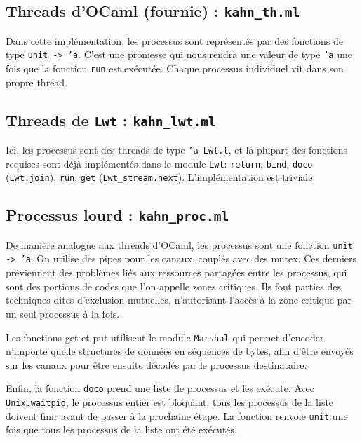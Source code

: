 \subsection{Threads d'OCaml (fournie) :
\texttt{kahn\_th.ml}}\label{threads-docaml-fournie-kahnux5fth.ml}

Dans cette implémentation, les processus sont représentés par des
fonctions de type \texttt{unit -\textgreater{} 'a}. C'est une promesse
qui nous rendra une valeur de type \texttt{'a} une fois que la fonction
\texttt{run} est exécutée. Chaque processus individuel vit dans son
propre thread.

\subsection{Threads de \texttt{Lwt} :
\texttt{kahn\_lwt.ml}}\label{threads-de-lwt-kahnux5flwt.ml}

Ici, les processus sont des threads de type \texttt{'a Lwt.t}, et la
plupart des fonctions requises sont déjà implémentés dans le module 
\texttt{Lwt}: \texttt{return}, \texttt{bind}, \texttt{doco} 
(\texttt{Lwt.join}), \texttt{run}, \texttt{get}
(\texttt{Lwt\_stream.next}). L'implémentation est triviale.

\subsection{Processus lourd :
\texttt{kahn\_proc.ml}}\label{processus-lourd-du-module-unix-docaml-kahnux5fproc.ml}

De manière analogue aux threads d'OCaml, les processus sont une fonction
\texttt{unit -\textgreater{} 'a}. On utilise des pipes pour les canaux,
couplés avec des mutex. Ces derniers préviennent des problèmes liés aux
ressources partagées entre les processus, qui sont des portions de codes
que l'on appelle zones critiques. Ils font parties des techniques
dites d'exclusion mutuelles, n'autorisant l'accès à la zone critique par
un seul processus à la fois.

Les fonctions get et put utilisent le module \texttt{Marshal} qui permet
d'encoder n'importe quelle structures de données en séquences de bytes,
afin d'être envoyés sur les canaux pour être ensuite décodés par le
processus destinataire.

Enfin, la fonction \texttt{doco} prend une liste de processus et les
exécute. Avec \texttt{Unix.waitpid}, le processus entier est bloquant:
tous les processus de la liste doivent finir avant de passer à la
prochaine étape. La fonction renvoie \texttt{unit} une fois que tous les
processus de la liste ont été exécutés.

